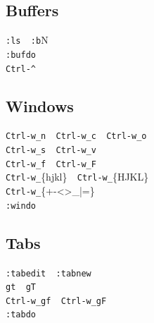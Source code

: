 \documentclass[14pt,svgnames,compress]{beamer}
\newcommand\hl[1]{\textcolor{HlColor}{#1}}
\newcommand\framesubtitlefontsize{\huge}
\newcommand\singleframesubtitle[1]{
    \begin{center}
        \framesubtitlefontsize #1
    \end{center}
}
\newcommand\subtitleframe{
    \begin{frame}
        \singleframesubtitle{\insertsubsectionhead}
    \end{frame}
}
\begin{document}
\subsection{Buffers}

\subtitleframe

\begin{frame}[fragile]
    \begin{spacing}{1.5} %
        \Large
        \centering
        \verb|:ls  :b|\hl{N} \\ \bigskip
        \verb|:bufdo| \\ \bigskip
        \verb|Ctrl-^| \\
    \end{spacing}
\end{frame}


\subsection{Windows}

\subtitleframe

\begin{frame}[fragile]
    \begin{spacing}{1.5} %
        \large
        \centering
        \verb|Ctrl-w_n  Ctrl-w_c  Ctrl-w_o| \\ \bigskip
        \verb|Ctrl-w_s  Ctrl-w_v| \\ \bigskip
        \verb|Ctrl-w_f  Ctrl-w_F| \\ \bigskip
        \verb|Ctrl-w_|\hl{\{hjkl\}}\verb|  Ctrl-w_|\hl{\{HJKL\}} \\ \bigskip
        \verb|Ctrl-w_|\hl{\{+-<>\_|=\}} \\ \bigskip
        \verb|:windo| \\
    \end{spacing}
\end{frame}


\subsection{Tabs}

\subtitleframe

\begin{frame}[fragile]
    \begin{spacing}{1.5} %
        \Large
        \centering
        \verb|:tabedit  :tabnew| \\ \bigskip
        \verb|gt  gT| \\ \bigskip
        \verb|Ctrl-w_gf  Ctrl-w_gF| \\ \bigskip
        \verb|:tabdo| \\
    \end{spacing}
\end{frame}
\end{document}
